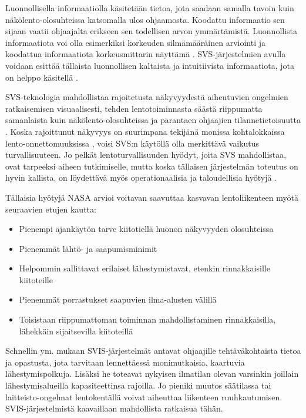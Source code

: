 \documentclass[utf8,bachelor,manualbib]{gradu3}
\begin{document}
Luonnollisella informaatiolla käsitetään tietoa, jota saadaan samalla tavoin kuin näkölento-olosuhteissa katsomalla ulos ohjaamosta. Koodattu informaatio sen sijaan vaatii ohjaajalta erikseen sen todellisen arvon ymmärtämistä. Luonnollista informaatiota voi olla esimerkiksi korkeuden silmämääräinen arviointi ja koodattua informaatiota korkeusmittarin näyttämä \citep{prinzel2004}. SVS-järjestelmien avulla voidaan esittää tällaista luonnollisen kaltaista ja intuitiivista informaatiota, jota on helppo käsitellä \citep{wickensandre1990}.

SVS-teknologia mahdollistaa rajoitetusta näkyvyydestä aiheutuvien ongelmien ratkaisemisen visuaalisesti, tehden lentotoiminnasta säästä riippumatta samanlaista kuin näkölento-olosuhteissa ja parantaen ohjaajien tilannetietoisuutta \citep{prinzel2004}. Koska rajoittunut näkyvyys on suurimpana tekijänä monissa kohtalokkaissa lento-onnettomuuksissa \citep{boeing1996}, voisi SVS:n käytöllä olla merkittävä vaikutus turvallisuuteen. Jo pelkät lentoturvallisuuden hyödyt, joita SVS mahdollistaa, ovat tarpeeksi aiheen tutkimiselle, mutta koska tällaisen järjestelmän toteutus on hyvin kallista, on löydettävä myös operationaalisia ja taloudellisia hyötyjä \citep{prinzel2004}.

Tällaisia hyötyjä NASA \citeyearpar{williamsym2001} arvioi voitavan saavuttaa kasvavan lentoliikenteen myötä seuraavien etujen kautta:

\begin{itemize}
\item Pienempi ajankäytön tarve kiitotiellä huonon näkyvyyden olosuhteissa
\item Pienemmät lähtö- ja saapumisminimit
\item Helpommin sallittavat erilaiset lähestymistavat, etenkin rinnakkaisille kiitoteille
\item Pienemmät porrastukset saapuvien ilma-alusten välillä
\item Toisistaan riippumattoman toiminnan mahdollistaminen rinnakkaisilla, lähekkäin sijaitsevilla kiitoteillä
\end{itemize} 

Schnellin ym. \citeyearpar{schnellym2004} mukaan SVIS-järjestelmät antavat ohjaajille tehtäväkohtaista tietoa ja opastusta, jota tarvitaan lennettäessä monimutkaisia, kaartuvia lähestymispolkuja. Lisäksi he toteavat nykyisen ilmatilan olevan varsinkin joillain lähestymisalueilla kapasiteettinsa rajoilla. Jo pieniki muutos säätilassa tai laitteisto-ongelmat lentokentällä voivat aiheuttaa liikenteen ruuhkautumisen. SVIS-järjestelmistä kaavaillaan mahdollista ratkaisua tähän.
\end{document}
